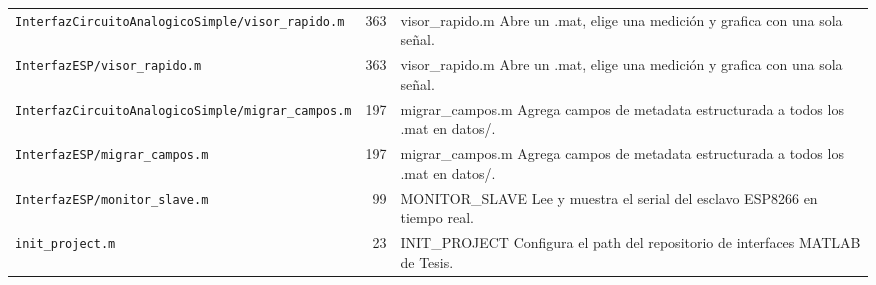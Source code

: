 \begin{longtable}{@{}p{5.4cm} r p{8.6cm}@{}}
\texttt{\scriptsize InterfazCircuitoAnalogicoSimple/visor\_rapido.m} & 363 & visor\_rapido.m Abre un .mat, elige una medición y grafica con una sola señal. \\
\texttt{\scriptsize InterfazESP/visor\_rapido.m} & 363 & visor\_rapido.m Abre un .mat, elige una medición y grafica con una sola señal. \\
\texttt{\scriptsize InterfazCircuitoAnalogicoSimple/migrar\_campos.m} & 197 & migrar\_campos.m Agrega campos de metadata estructurada a todos los .mat en datos/. \\
\texttt{\scriptsize InterfazESP/migrar\_campos.m} & 197 & migrar\_campos.m Agrega campos de metadata estructurada a todos los .mat en datos/. \\
\texttt{\scriptsize InterfazESP/monitor\_slave.m} & 99 & MONITOR\_SLAVE  Lee y muestra el serial del esclavo ESP8266 en tiempo real. \\
\texttt{\scriptsize init\_project.m} & 23 & INIT\_PROJECT Configura el path del repositorio de interfaces MATLAB de Tesis. \\
\end{longtable}
\normalsize

